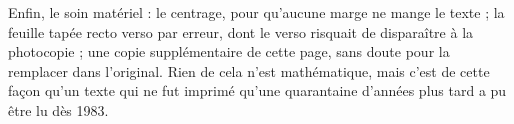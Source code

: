 \documentclass[11pt,a4paper]{article}
\begin{document}
Enfin, le soin matériel : le centrage, pour qu'aucune marge ne mange le
texte ; la feuille tapée recto verso par erreur, dont le verso risquait de
disparaître à la photocopie ; une copie supplémentaire de cette page, sans
doute pour la remplacer dans l'original. Rien de cela n'est mathématique,
mais c'est de cette façon qu'un texte qui ne fut imprimé qu'une quarantaine
d'années plus tard a pu être lu dès 1983.
\end{document}
